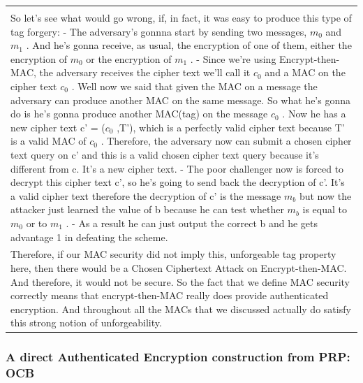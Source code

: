 \documentclass[11pt]{article}
\begin{document}
\begin{longtable}[]{@{}l@{}}
\begin{minipage}[t]{0.07\columnwidth}
\end{minipage}\tabularnewline
\begin{minipage}[t]{0.07\columnwidth}\raggedright
So let's see what would go wrong, if, in fact, it was easy to produce
this type of tag forgery: - The adversary's gonnna start by sending two
messages, \(m_{0}\) and \(m_{1}\) . And he's gonna receive, as usual,
the encryption of one of them, either the encryption of \(m_{0}\) or the
encryption of \(m_{1}\) . - Since we're using Encrypt-then-MAC, the
adversary receives the cipher text we'll call it \(c_{0}\) and a MAC on
the cipher text \(c_{0}\) . Well now we said that given the MAC on a
message the adversary can produce another MAC on the same message. So
what he's gonna do is he's gonna produce another MAC(tag) on the message
\(c_{0}\) . Now he has a new cipher text c' = (\(c_{0}\) ,T'), which is
a perfectly valid cipher text because T' is a valid MAC of \(c_{0}\) .
Therefore, the adversary now can submit a chosen cipher text query on c'
and this is a valid chosen cipher text query because it's different from
c. It's a new cipher text. - The poor challenger now is forced to
decrypt this cipher text c', so he's going to send back the decryption
of c'. It's a valid cipher text therefore the decryption of c' is the
message \(m_{b}\) but now the attacker just learned the value of b
because he can test whether \(m_{b}\) is equal to \(m_{0}\) or to
\(m_{1}\) . - As a result he can just output the correct b and he gets
advantage 1 in defeating the scheme.\strut
\end{minipage}\tabularnewline
\begin{minipage}[t]{0.07\columnwidth}\raggedright
Therefore, if our MAC security did not imply this, unforgeable tag
property here, then there would be a Chosen Ciphertext Attack on
Encrypt-then-MAC. And therefore, it would not be secure. So the fact
that we define MAC security correctly means that encrypt-then-MAC really
does provide authenticated encryption. And throughout all the MACs that
we discussed actually do satisfy this strong notion of unforgeability.
\strut
\end{minipage}\tabularnewline
\bottomrule
\end{longtable}

\hypertarget{a-direct-authenticated-encryption-construction-from-prp-ocb}{%
\subsubsection{A direct Authenticated Encryption construction from PRP:
OCB}\label{a-direct-authenticated-encryption-construction-from-prp-ocb}}
\end{document}
